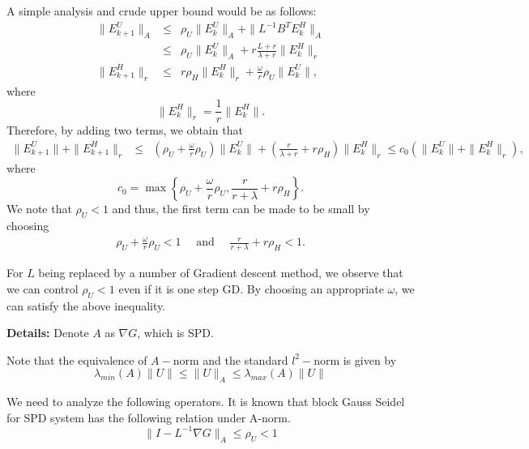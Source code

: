 \begin{itemize}
A simple analysis and crude upper bound would be as follows: 
\begin{eqnarray*}
\|E_{k+1}^U\|_{A} &\leq& \rho_U \|E_k^U\|_{A} + \|L^{-1} B^T E_k^H\|_{A} \\ 
&\leq&  \rho_U \|E_k^U\|_{A} + r \frac{L + r}{\lambda + r} \|E_k^H\|_r \\
\|E_{k+1}^H\|_r &\leq& r \rho_H \|E_k^H\|_r + \frac{\omega}{r} \rho_U \|E_k^U\|,  
\end{eqnarray*}
where 
\begin{equation}
\|E_k^H\|_r = \frac{1}{r}\|E_k^H\|.   
\end{equation}
Therefore, by adding two terms, we obtain that 
\begin{eqnarray*}
\|E_{k+1}^U\| + \|E_{k+1}^H\|_r &\leq& \left ( \rho_U + \frac{\omega}{r} \rho_U \right) \|E_k^U\| + \left ( \frac{r}{\lambda + r} + r \rho_H \right ) \|E_k^H\|_r \leq c_0 \left ( \|E_{k}^U\| + \|E_{k}^H\|_r \right ),  
\end{eqnarray*}
where 
\begin{equation}
c_0 = \max \left \{ \rho_U + \frac{\omega}{r} \rho_U, \frac{r}{r+\lambda} + r\rho_H \right \}. 
\end{equation} 
We note that $\rho_U < 1$ and thus, the first term can be made to be small by choosing 
\begin{eqnarray}
\rho_U + \frac{\omega}{r} \rho_U < 1 \quad \mbox{ and } \quad \frac{r}{r+\lambda} + r\rho_H < 1. 
\end{eqnarray}
\begin{remark}
For $L$ being replaced by a number of Gradient descent method, we observe that we can control $\rho_U < 1$ even if it is one step GD. By choosing an appropriate $\omega$, we can satisfy the above inequality. 
\end{remark}


\textbf{Details: }
Denote $A$ as $\nabla G$, which is SPD. 

Note that the equivalence of $A-$norm and the standard $l^2-$norm is given by 
\begin{equation}
  \lambda_{min} (A) \|U  \| \leq    \| U \|_A \leq \lambda_{max} (A )\|U  \|
\end{equation}

We need to analyze the following operators. 
It is known that block Gauss Seidel for SPD system has the following relation under A-norm.
\begin{equation}
    \| I - L^{-1} \nabla G \|_A \leq \rho_U < 1 
\end{equation}



\end{itemize}
